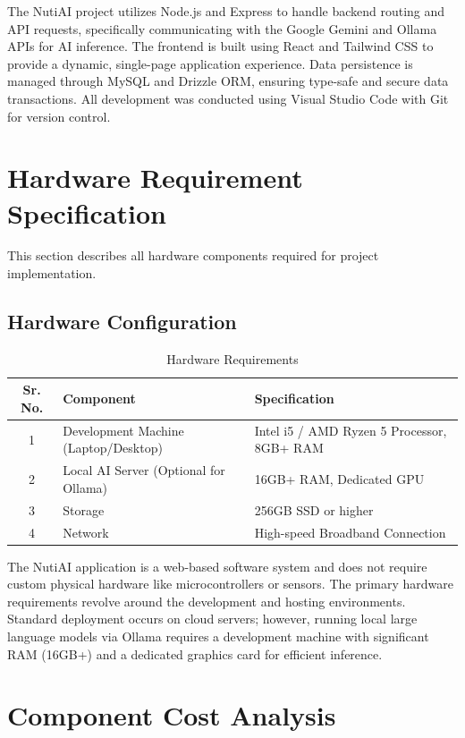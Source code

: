 \documentclass[12pt,a4paper]{report}
\begin{document}
The NutiAI project utilizes Node.js and Express to handle backend routing and API requests, specifically communicating with the Google Gemini and Ollama APIs for AI inference. The frontend is built using React and Tailwind CSS to provide a dynamic, single-page application experience. Data persistence is managed through MySQL and Drizzle ORM, ensuring type-safe and secure data transactions. All development was conducted using Visual Studio Code with Git for version control.

\section{Hardware Requirement Specification}
This section describes all hardware components required for project implementation.

\subsection{Hardware Configuration}

\begin{table}[H]
\centering
\begin{tabular}{|c|p{4.5cm}|p{6cm}|}
\hline
\textbf{Sr. No.} & \textbf{Component} & \textbf{Specification} \\ \hline
1 & Development Machine (Laptop/Desktop) & Intel i5 / AMD Ryzen 5 Processor, 8GB+ RAM \\ \hline
2 & Local AI Server (Optional for Ollama) & 16GB+ RAM, Dedicated GPU \\ \hline
3 & Storage & 256GB SSD or higher \\ \hline
4 & Network & High-speed Broadband Connection \\ \hline
\end{tabular}
\caption{Hardware Requirements}
\end{table}

The NutiAI application is a web-based software system and does not require custom physical hardware like microcontrollers or sensors. The primary hardware requirements revolve around the development and hosting environments. Standard deployment occurs on cloud servers; however, running local large language models via Ollama requires a development machine with significant RAM (16GB+) and a dedicated graphics card for efficient inference.

\section{Component Cost Analysis}
\end{document}
